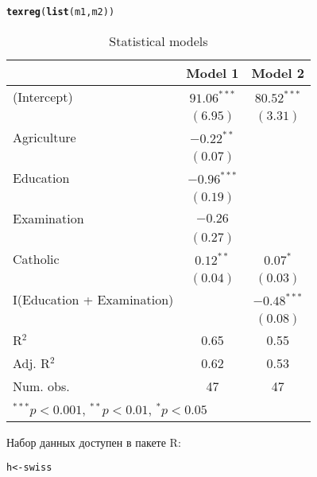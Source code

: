 \documentclass[pdftex,11pt,openany]{book}\usepackage[]{graphicx}\usepackage[]{color}
\makeatletter
\newcommand{\hlstd}[1]{\textcolor[rgb]{0.345,0.345,0.345}{#1}}%
\newcommand{\hlkwb}[1]{\textcolor[rgb]{0.69,0.353,0.396}{#1}}%
\newcommand{\hlkwd}[1]{\textcolor[rgb]{0.737,0.353,0.396}{\textbf{#1}}}%
\newenvironment{kframe}{%
 \def\at@end@of@kframe{}%
 \ifinner\ifhmode%
  \def\at@end@of@kframe{\end{minipage}}%
  \begin{minipage}{\columnwidth}%
 \fi\fi%
 \def\FrameCommand##1{\hskip\@totalleftmargin \hskip-\fboxsep
 \colorbox{shadecolor}{##1}\hskip-\fboxsep
     \hskip-\linewidth \hskip-\@totalleftmargin \hskip\columnwidth}%
 \MakeFramed {\advance\hsize-\width
   \@totalleftmargin\z@ \linewidth\hsize
   \@setminipage}}%
 {\par\unskip\endMakeFramed%
 \at@end@of@kframe}
\newenvironment{knitrout}{}{} %
\makeatother
\begin{document}
\begin{problem}
\begin{kframe}
\begin{alltt}
\hlkwd{texreg}\hlstd{(}\hlkwd{list}\hlstd{(m1,m2))}
\end{alltt}
\end{kframe}
\begin{table}
\begin{center}
\begin{tabular}{l c c }
\hline
                           & Model 1 & Model 2 \\
\hline
(Intercept)                & $91.06^{***}$ & $80.52^{***}$ \\
                           & $(6.95)$      & $(3.31)$      \\
Agriculture                & $-0.22^{**}$  &               \\
                           & $(0.07)$      &               \\
Education                  & $-0.96^{***}$ &               \\
                           & $(0.19)$      &               \\
Examination                & $-0.26$       &               \\
                           & $(0.27)$      &               \\
Catholic                   & $0.12^{**}$   & $0.07^{*}$    \\
                           & $(0.04)$      & $(0.03)$      \\
I(Education + Examination) &               & $-0.48^{***}$ \\
                           &               & $(0.08)$      \\
\hline
R$^2$                      & 0.65          & 0.55          \\
Adj. R$^2$                 & 0.62          & 0.53          \\
Num. obs.                  & 47            & 47            \\
\hline
\multicolumn{3}{l}{\scriptsize{$^{***}p<0.001$, $^{**}p<0.01$, $^*p<0.05$}}
\end{tabular}
\caption{Statistical models}
\label{table:coefficients}
\end{center}
\end{table}


Набор данных доступен в пакете R:
\begin{knitrout}
\color{fgcolor}\begin{kframe}
\begin{alltt}
\hlstd{h} \hlkwb{<-} \hlstd{swiss}
\end{alltt}
\end{kframe}
\end{knitrout}


\end{problem}
\end{document}
